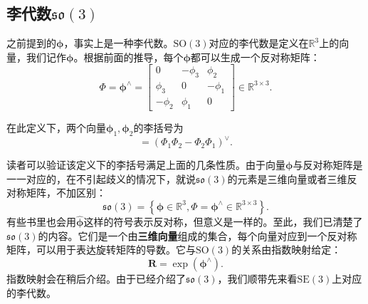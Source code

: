 \subsection{李代数$\mathfrak{so}(3)$}
之前提到的$\bm{\phi}$，事实上是一种李代数。$\mathrm{SO}(3)$对应的李代数是定义在$\mathbb{R}^3$上的向量，我们记作$\bm{\phi}$。根据前面的推导，每个$\bm{\phi}$都可以生成一个反对称矩阵：
\begin{equation}
\label{eq:phi}
\bm{\varPhi} = \bm{\phi}^{\wedge} = \left[ {\begin{array}{*{20}{c}}
	0&{ - {\phi _3}}&{{\phi _2}}\\
	{{\phi _3}}&0&{ - {\phi _1}}\\
	{ - {\phi _2}}&{{\phi _1}}&0
	\end{array}} \right] \in \mathbb{R}^{3 \times 3}.
\end{equation}

在此定义下，两个向量$\bm{\phi}_1, \bm{\phi}_2$的李括号为
\begin{equation}
[\bm{\phi}_1, \bm{\phi}_2] = \left( \bm{ \varPhi }_1 \bm{ \varPhi }_2 - \bm{ \varPhi }_2 \bm{ \varPhi }_1 \right)^\vee.
\end{equation}

读者可以验证该定义下的李括号满足上面的几条性质。由于向量$\bm{\phi}$与反对称矩阵是一一对应的，在不引起歧义的情况下，就说$\mathfrak{so}(3)$的元素是三维向量或者三维反对称矩阵，不加区别：
\begin{equation}
\mathfrak{so}(3) = \left\{ \bm{\phi} \in \mathbb{R}^3, \bm{\varPhi} = \bm{\phi^\wedge} \in \mathbb{R}^{3 \times 3} \right\}.
\end{equation}
有些书里也会用$\widehat{\bm{\phi}}$这样的符号表示反对称，但意义是一样的。至此，我们已清楚了$\mathfrak{so}(3)$的内容。它们是一个由\textbf{三维向量}组成的集合，每个向量对应到一个反对称矩阵，可以用于表达旋转矩阵的导数。它与$\mathrm{SO}(3)$的关系由指数映射给定：
\begin{equation}
\bm{R} = \exp ( \bm{\phi}^\wedge ).
\end{equation}
指数映射会在稍后介绍。由于已经介绍了$\mathfrak{so}(3)$，我们顺带先来看$\mathrm{SE}(3)$上对应的李代数。

